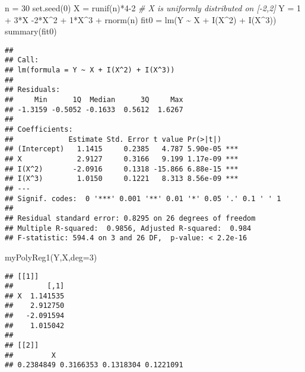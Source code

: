 \documentclass[
  11pt,
]{article}
\newenvironment{Shaded}{\begin{snugshade}}{\end{snugshade}}
\newcommand{\AttributeTok}[1]{\textcolor[rgb]{0.77,0.63,0.00}{#1}}
\newcommand{\CommentTok}[1]{\textcolor[rgb]{0.56,0.35,0.01}{\textit{#1}}}
\newcommand{\DecValTok}[1]{\textcolor[rgb]{0.00,0.00,0.81}{#1}}
\newcommand{\FunctionTok}[1]{\textcolor[rgb]{0.00,0.00,0.00}{#1}}
\newcommand{\NormalTok}[1]{#1}
\newcommand{\OtherTok}[1]{\textcolor[rgb]{0.56,0.35,0.01}{#1}}
\newcommand{\SpecialCharTok}[1]{\textcolor[rgb]{0.00,0.00,0.00}{#1}}
\begin{document}
\begin{Shaded}
\begin{Highlighting}[]
\NormalTok{n }\OtherTok{=} \DecValTok{30} 
\FunctionTok{set.seed}\NormalTok{(}\DecValTok{0}\NormalTok{)}
\NormalTok{X }\OtherTok{=} \FunctionTok{runif}\NormalTok{(n)}\SpecialCharTok{*}\DecValTok{4{-}2} \CommentTok{\# X is uniformly distributed on [{-}2,2]}
\NormalTok{Y }\OtherTok{=} \DecValTok{1} \SpecialCharTok{+} \DecValTok{3}\SpecialCharTok{*}\NormalTok{X }\SpecialCharTok{{-}}\DecValTok{2}\SpecialCharTok{*}\NormalTok{X}\SpecialCharTok{\^{}}\DecValTok{2} \SpecialCharTok{+} \DecValTok{1}\SpecialCharTok{*}\NormalTok{X}\SpecialCharTok{\^{}}\DecValTok{3} \SpecialCharTok{+} \FunctionTok{rnorm}\NormalTok{(n)}
\NormalTok{fit0 }\OtherTok{=} \FunctionTok{lm}\NormalTok{(Y }\SpecialCharTok{\textasciitilde{}}\NormalTok{ X }\SpecialCharTok{+} \FunctionTok{I}\NormalTok{(X}\SpecialCharTok{\^{}}\DecValTok{2}\NormalTok{) }\SpecialCharTok{+} \FunctionTok{I}\NormalTok{(X}\SpecialCharTok{\^{}}\DecValTok{3}\NormalTok{))}
\FunctionTok{summary}\NormalTok{(fit0)}
\end{Highlighting}
\end{Shaded}

\begin{verbatim}
## 
## Call:
## lm(formula = Y ~ X + I(X^2) + I(X^3))
## 
## Residuals:
##     Min      1Q  Median      3Q     Max 
## -1.3159 -0.5052 -0.1633  0.5612  1.6267 
## 
## Coefficients:
##             Estimate Std. Error t value Pr(>|t|)    
## (Intercept)   1.1415     0.2385   4.787 5.90e-05 ***
## X             2.9127     0.3166   9.199 1.17e-09 ***
## I(X^2)       -2.0916     0.1318 -15.866 6.88e-15 ***
## I(X^3)        1.0150     0.1221   8.313 8.56e-09 ***
## ---
## Signif. codes:  0 '***' 0.001 '**' 0.01 '*' 0.05 '.' 0.1 ' ' 1
## 
## Residual standard error: 0.8295 on 26 degrees of freedom
## Multiple R-squared:  0.9856, Adjusted R-squared:  0.984 
## F-statistic: 594.4 on 3 and 26 DF,  p-value: < 2.2e-16
\end{verbatim}

\begin{Shaded}
\begin{Highlighting}[]
\FunctionTok{myPolyReg1}\NormalTok{(Y,X,}\AttributeTok{deg=}\DecValTok{3}\NormalTok{)}
\end{Highlighting}
\end{Shaded}

\begin{verbatim}
## [[1]]
##        [,1]
## X  1.141535
##    2.912750
##   -2.091594
##    1.015042
## 
## [[2]]
##         X                               
## 0.2384849 0.3166353 0.1318304 0.1221091
\end{verbatim}
\end{document}
